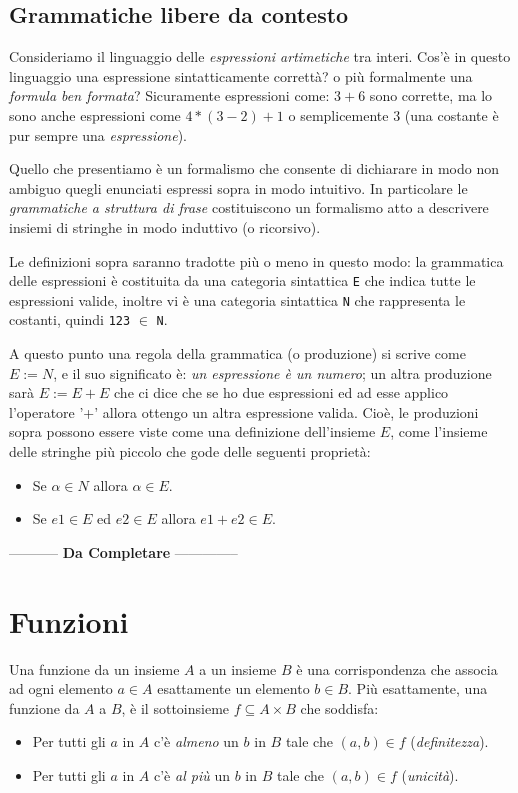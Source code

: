 \subsection{Grammatiche libere da contesto}

Consideriamo il linguaggio delle \emph{espressioni artimetiche} tra interi. Cos'è in questo
linguaggio una espressione sintatticamente correttà? o più formalmente una \emph{formula
ben formata}? Sicuramente espressioni come: $3+6$ sono corrette, ma lo sono anche espressioni come
$4 * (3 - 2 ) + 1$ o semplicemente $3$ (una costante è pur sempre una \emph{espressione}).

Quello che presentiamo è un formalismo che consente di dichiarare in modo non ambiguo quegli
enunciati espressi sopra in modo intuitivo. In particolare le \emph{grammatiche a struttura
di frase} costituiscono un formalismo atto a descrivere insiemi di stringhe in modo induttivo (o ricorsivo).

Le definizioni sopra saranno tradotte più o meno in questo modo: la grammatica delle espressioni
è costituita da una categoria sintattica \texttt{E} che indica tutte le espressioni valide,
inoltre vi è una categoria sintattica \texttt{N} che rappresenta le costanti, 
quindi \texttt{123} $\in$ \texttt{N}.

A questo punto una regola della grammatica (o produzione) si scrive come $E := N$, e il suo significato è:
\emph{un espressione è un numero}; un altra produzione sarà $E := E + E$ che ci dice che se ho due
espressioni ed ad esse applico l'operatore '+' allora ottengo un altra espressione valida.
Cioè, le produzioni sopra possono essere viste come una definizione dell'insieme $E$, come l'insieme
delle stringhe più piccolo che gode delle seguenti proprietà:
\begin{itemize}
 \item Se $\alpha \in N$ allora $\alpha \in E$.
 \item Se $e1 \in E$ ed $e2 \in E$ allora $e1 + e2 \in E$.
\end{itemize}

\begin{center}-----------    \textbf{Da Completare}    -------------- \end{center}

\section{Funzioni}

\begin{defn}
  Una funzione da un insieme $A$ a un insieme $B$ è una corrispondenza
  che associa ad ogni elemento $a \in A$ esattamente un elemento $b
  \in B$. Più esattamente, una funzione da $A$ a $B$, è il
  sottoinsieme $f \subseteq A\times B$ che soddisfa:
  \begin{itemize}
  \item Per tutti gli $a$ in $A$ c'è \emph{almeno} un $b$ in $B$ tale
    che $(a,b) \in f$ (\emph{definitezza}).
  \item Per tutti gli $a$ in $A$ c'è \emph{al più} un $b$ in $B$ tale
    che $(a,b) \in f$ (\emph{unicità}).
  \end{itemize}
\end{defn}


